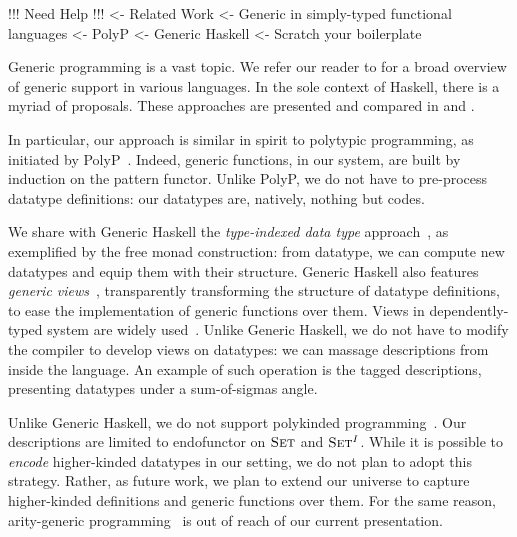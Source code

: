 \begin{wstructure}
!!! Need Help !!!
<- Related Work
    <- Generic in simply-typed functional languages
        <- PolyP \cite{jansson:polyp}
        <- Generic Haskell \cite{hinze:generic-haskell}
        <- Scratch your boilerplate \cite{spj:syb}
\end{wstructure}

Generic programming is a vast topic. We refer our reader to 
\citet{garcia:generic-comparative-study} for a broad overview of
generic support in various languages. In the sole context of Haskell,
there is a myriad of proposals. These approaches are presented and
compared in \citet{hinze:generic-approach-comparative} and
\citet{rodriguez:generic-libs-comparative}.

In particular, our approach is similar in spirit to polytypic
programming, as initiated by PolyP~\cite{jansson:polyp}. Indeed,
generic functions, in our system, are built by induction on the
pattern functor. Unlike PolyP, we do not have to pre-process datatype
definitions: our datatypes are, natively, nothing but codes.

We share with Generic Haskell the \emph{type-indexed data type}
approach~\cite{hinze:generic-haskell}, as exemplified by the free
monad construction: from datatype, we can compute new datatypes and
equip them with their structure. Generic Haskell also features
\emph{generic views}~\cite{holdermans:generic-view}, transparently
transforming the structure of datatype definitions, to ease the
implementation of generic functions over them. Views in
dependently-typed system are widely
used~\cite{mcbride.mckinna:view-from-the-left}. Unlike Generic
Haskell, we do not have to modify the compiler to develop views on
datatypes: we can massage descriptions from inside the language. An
example of such operation is the tagged descriptions, presenting
datatypes under a sum-of-sigmas angle.

Unlike Generic Haskell, we do not support polykinded
programming~\cite{hinze:polytypic-polykinded}. Our descriptions are
limited to endofunctor on $\Set$ and $\Set^I$. While it is possible to
\emph{encode} higher-kinded datatypes in our setting, we do not plan
to adopt this strategy. Rather, as future work, we plan to extend our
universe to capture higher-kinded definitions and generic functions
over them. For the same reason, arity-generic
programming~\cite{weirich:arity-generic} is out of reach of our
current presentation.

